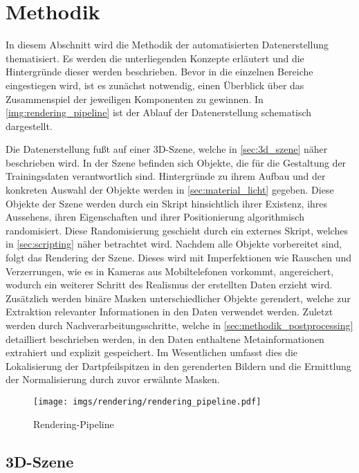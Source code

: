 
\section{Methodik}
\label{sec:daten:methodik}

In diesem Abschnitt wird die Methodik der automatisierten Datenerstellung thematisiert. Es werden die unterliegenden Konzepte erläutert und die Hintergründe dieser werden beschrieben. Bevor in die einzelnen Bereiche eingestiegen wird, ist es zunächst notwendig, einen Überblick über das Zusammenspiel der jeweiligen Komponenten zu gewinnen. In \autoref{img:rendering_pipeline} ist der Ablauf der Datenerstellung schematisch dargestellt.

Die Datenerstellung fußt auf einer 3D-Szene, welche in \autoref{sec:3d_szene} näher beschrieben wird. In der Szene befinden sich Objekte, die für die Gestaltung der Trainingsdaten verantwortlich sind. Hintergründe zu ihrem Aufbau und der konkreten Auswahl der Objekte werden in \autoref{sec:material_licht} gegeben. Diese Objekte der Szene werden durch ein Skript hinsichtlich ihrer Existenz, ihres Aussehens, ihren Eigenschaften und ihrer Positionierung algorithmisch randomisiert. Diese Randomisierung geschieht durch ein externes Skript, welches in \autoref{sec:scripting} näher betrachtet wird. Nachdem alle Objekte vorbereitet sind, folgt das Rendering der Szene. Dieses wird mit Imperfektionen wie Rauschen und Verzerrungen, wie es in Kameras aus Mobiltelefonen vorkommt, angereichert, wodurch ein weiterer Schritt des Realismus der erstellten Daten erzieht wird. Zusätzlich werden binäre Masken unterschiedlicher Objekte gerendert, welche zur Extraktion relevanter Informationen in den Daten verwendet werden. Zuletzt werden durch Nachverarbeitungsschritte, welche in \autoref{sec:methodik_postprocessing} detailliert beschrieben werden, in den Daten enthaltene Metainformationen extrahiert und explizit gespeichert. Im Wesentlichen umfasst dies die Lokalisierung der Dartpfeilspitzen in den gerenderten Bildern und die Ermittlung der Normalisierung durch zuvor erwähnte Masken.

\begin{figure}
    \centering
    \texttt{[image: imgs/rendering/rendering\_pipeline.pdf]}
    \caption{Rendering-Pipeline}
    \label{img:rendering_pipeline}
\end{figure}

\subsection{3D-Szene} %
\label{sec:3d_szene}

